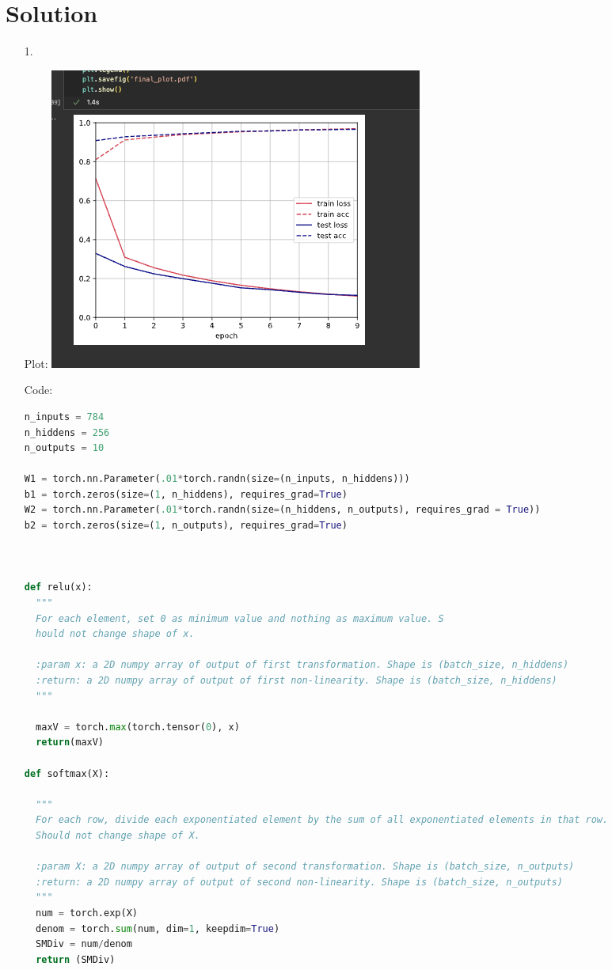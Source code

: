 \documentclass[submit]{harvardml}
\newenvironment{answer}
  {\section*{Solution}}
{}
\begin{document}
\begin{answer}

  \begin{enumerate}
    \item[1.]

      Plot: \includegraphics[width=0.5\linewidth]{hw3/ss1.png}


      Code:

      \begin{lstlisting}[language=Python]
n_inputs = 784
n_hiddens = 256
n_outputs = 10

W1 = torch.nn.Parameter(.01*torch.randn(size=(n_inputs, n_hiddens)))
b1 = torch.zeros(size=(1, n_hiddens), requires_grad=True)
W2 = torch.nn.Parameter(.01*torch.randn(size=(n_hiddens, n_outputs), requires_grad = True))
b2 = torch.zeros(size=(1, n_outputs), requires_grad=True)



def relu(x):
  """
  For each element, set 0 as minimum value and nothing as maximum value. S
  hould not change shape of x.

  :param x: a 2D numpy array of output of first transformation. Shape is (batch_size, n_hiddens)
  :return: a 2D numpy array of output of first non-linearity. Shape is (batch_size, n_hiddens)
  """
  
  maxV = torch.max(torch.tensor(0), x) 
  return(maxV)

def softmax(X):
  
  """
  For each row, divide each exponentiated element by the sum of all exponentiated elements in that row. 
  Should not change shape of X.

  :param X: a 2D numpy array of output of second transformation. Shape is (batch_size, n_outputs)
  :return: a 2D numpy array of output of second non-linearity. Shape is (batch_size, n_outputs)
  """
  num = torch.exp(X)
  denom = torch.sum(num, dim=1, keepdim=True) 
  SMDiv = num/denom
  return (SMDiv)





\end{lstlisting}
\end{enumerate}
\end{answer}
\end{document}
